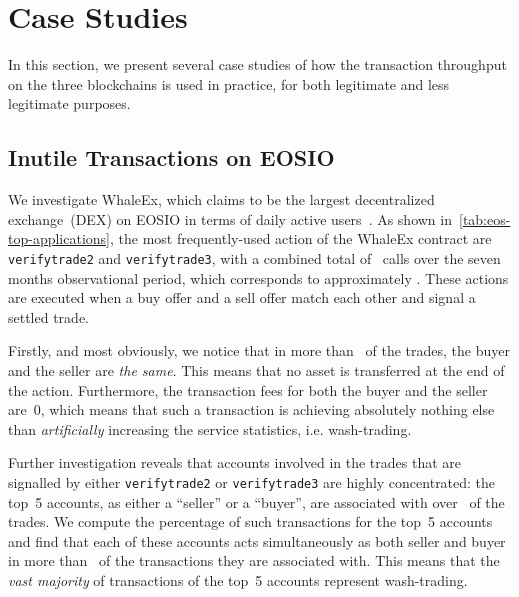 \section{Case Studies}
\label{sec:4:case-studies}

In this section, we present several case studies of how the transaction throughput on the three blockchains is used in practice,  for both legitimate and less legitimate purposes.

\subsection{Inutile Transactions on EOSIO}
\label{sec:eoscase}
We investigate WhaleEx, which claims to be the largest decentralized exchange~(DEX) on EOSIO in terms of daily active users~\cite{WhaleEx2020}. 
As shown in~\autoref{tab:eos-top-applications}, the most frequently-used action of the WhaleEx contract are \texttt{verifytrade2} and \texttt{verifytrade3}, with a combined total of~ calls over the seven months observational period, which corresponds to approximately . These actions are executed when a buy offer and a sell offer match each other and signal a settled trade.



Firstly, and most obviously, we notice that in more than~ of the trades, the buyer and the seller are \emph{the same}. 
This means that no asset is transferred at the end of the action. 
Furthermore, the transaction fees for both the buyer and the seller are~0, which means that such a transaction is achieving absolutely nothing else than \emph{artificially} increasing the service statistics, i.e. wash-trading.

Further investigation reveals that accounts involved in the trades that are signalled by either \texttt{verifytrade2} or \texttt{verifytrade3} are highly concentrated: the top~5 accounts, as either a ``seller'' or a ``buyer'', are associated with over~ of the trades. 
We compute the percentage of such transactions for the top~5 accounts and find that each of these accounts acts simultaneously as both seller and buyer in more than~ of the transactions they are associated with. 
This means that the \emph{vast majority} of transactions of the top~5 accounts represent wash-trading.

